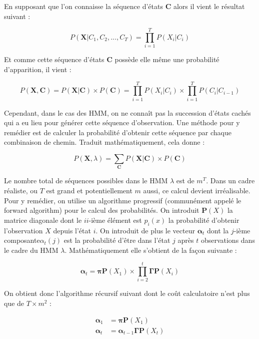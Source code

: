 \documentclass[12pt]{report}
\begin{document}
En supposant que l'on connaisse la séquence d'états $\bm{C}$ alors il vient le résultat suivant :

\begin{equation}
P(\bm{X}|C_1,C_2,...,C_T) = \prod\limits_{i=1}^T P(X_i|C_i)
\end{equation}

Et comme cette séquence d'états $\bm{C}$ possède elle même une probabilité d'apparition, il vient :

\begin{equation}
P(\bm{X},\bm{C}) = P(\bm{X}|\bm{C}) \times P(\bm{C}) =   \prod\limits_{i=1}^T P(X_i|C_i) \times \prod \limits_{i=1}^T P(C_i|C_{i-1})
\end{equation}

Cependant, dans le cas des HMM, on ne connaît pas la succession d'états cachés qui a eu lieu pour générer cette séquence d'observation. Une méthode pour y remédier est de calculer la probabilité d'obtenir cette séquence par chaque combinaison de chemin. Traduit mathématiquement, cela donne :

\begin{equation}
P(\bm{X},\lambda) =\sum\limits_{\bm{C}} P(\bm{X}|\bm{C}) \times P(\bm{C}) 
\end{equation}

Le nombre total de séquences possibles dans le HMM $\lambda$ est de $m^T$. Dans un cadre réaliste, ou $T$ est grand et potentiellement $m$ aussi, ce calcul devient irréalisable. Pour y remédier, on utilise un algorithme progressif (communément appelé le forward algorithm) pour le calcul des probabilités. On introduit $\bm{P}(X)$ la matrice diagonale dont le $ii$-ième élément est $p_i(x)$ la probabilité d'obtenir l'observation $X$ depuis l'état $i$. On introduit de plus le vecteur $\bm{\alpha}_t$ dont la $j$-ième composante$ \alpha_t(j)$ est la probabilité d'être dans l'état $j$ après $t$ observations dans le cadre du HMM $\lambda$. Mathématiquement elle s'obtient de la façon suivante : 

\begin{equation}
\bm{\alpha}_t = \bm{\pi} \bm{P}(X_1) \times \prod\limits_{i=2}^t \bm{\Gamma}\bm{P}(X_i)
\end{equation}

On obtient donc l'algorithme récursif suivant dont le coût calculatoire n'est plus que de $T \times m^2$ :

\begin{align} 
\label{eq::HMM:ForwardAlgo}
\bm{\alpha}_1 &= \bm{\pi} \bm{P}(X_1) \\ 
\bm{\alpha}_t &= \bm{\alpha}_{t-1} \bm{\Gamma} \bm{P}(X_t)
\end{align}
\end{document}
